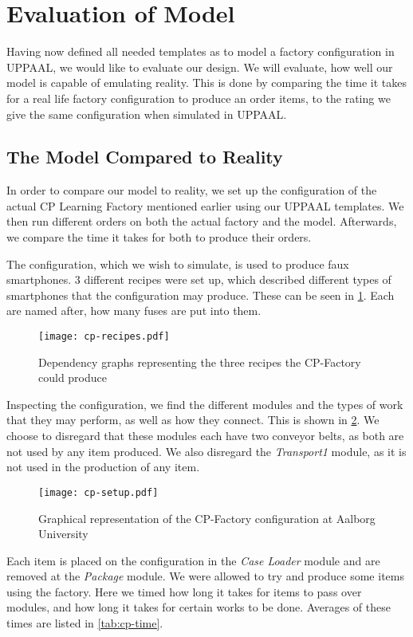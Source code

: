 \section{Evaluation of Model}
Having now defined all needed templates as to model a factory configuration in UPPAAL, we would like to evaluate our design. We will evaluate, how well our model is capable of emulating reality. This is done by comparing the time it takes for a real life factory configuration to produce an order items, to the rating we give the same configuration when simulated in UPPAAL. 

\subsection{The Model Compared to Reality} \label{ssec:realcomparison}
In order to compare our model to reality, we set up the configuration of the actual CP Learning Factory mentioned earlier using our UPPAAL templates. We then run different orders on both the actual factory and the model. Afterwards, we compare the time it takes for both to produce their orders.  

The configuration, which we wish to simulate, is used to produce faux smartphones. 3 different recipes were set up, which described different types of smartphones that the configuration may produce. These can be seen in \cref{fig:cp-recipes}. Each are named after, how many fuses are put into them.

\begin{figure}[H]
\centering
\texttt{[image: cp-recipes.pdf]}
\caption{Dependency graphs representing the three recipes the CP-Factory could produce}
\label{fig:cp-recipes}
\end{figure}

Inspecting the configuration, we find the different modules and the types of work that they may perform, as well as how they connect. This is shown in \cref{fig:cp-setup}. We choose to disregard that these modules each have two conveyor belts, as both are not used by any item produced. We also disregard the \textit{Transport1} module, as it is not used in the production of any item.

\begin{figure}[H]
\centering
\texttt{[image: cp-setup.pdf]}
\caption{Graphical representation of the CP-Factory configuration at Aalborg University}
\label{fig:cp-setup}
\end{figure}

Each item is placed on the configuration in the \textit{Case Loader} module and are removed at the \textit{Package} module. We were allowed to try and produce some items using the factory. Here we timed how long it takes for items to pass over modules, and how long it takes for certain works to be done. Averages of these times are listed in \cref{tab:cp-time}.

